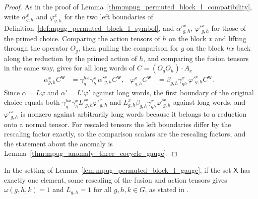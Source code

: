 \begin{proof}\leanok
    As in the proof of Lemma~\ref{thm:mpug_permuted_block_l_compatibility},
    write $\alpha^x_{g,h}$ and $\varphi^x_{g,h}$ for the two left boundaries
    of Definition~\ref{def:mpug_permuted_block_l_symbol}, and
    $\alpha'^x_{g,h}$, $\varphi'^x_{g,h}$ for those of the primed choice.
    Comparing the action tensors of $h$ on the block $x$ and lifting through
    the operator $O_g$, then pulling the comparison for $g$ on the block $hx$
    back along the reduction by the primed action of $h$, and comparing the
    fusion tensors in the same way, gives for all long words of
    $C=(O_gO_h)\cdot A_x$
    \begin{align}
        \alpha^x_{g,h}C^{\mathbf w}
         & =\gamma^{hx}_g\gamma^x_h\,\alpha'^x_{g,h}C^{\mathbf w},   &
        \varphi^x_{g,h}C^{\mathbf w}
         & =\beta_{g,h}\gamma^x_{gh}\,\varphi'^x_{g,h}C^{\mathbf w}.
        \label{eq:mpug_permuted_l_gauge_boundaries}
    \end{align}
    Since $\alpha=L\varphi$ and $\alpha'=L'\varphi'$ against long words, the
    first boundary of the original choice equals both
    $\gamma^{hx}_g\gamma^x_hL'^x_{g,h}\varphi'^x_{g,h}$ and
    $L^x_{g,h}\beta_{g,h}\gamma^x_{gh}\varphi'^x_{g,h}$ against long words,
    and $\varphi'^x_{g,h}$ is nonzero against arbitrarily long words because
    it belongs to a reduction onto a normal tensor. For rescaled tensors the left boundaries
    differ by the rescaling factor exactly, so the comparison scalars are the
    rescaling factors, and the statement about the anomaly is
    Lemma~\ref{thm:mpug_anomaly_three_cocycle_gauge}.
\end{proof}

\begin{lemma}
    \label{lem:mpug_single_block_gauge_trivial}
    \leanok
    In the setting of Lemma~\ref{lem:mpug_permuted_block_l_gauge}, if the set
    $\mathsf X$ has exactly one element, some rescaling of the fusion and
    action tensors gives $\omega(g,h,k)=1$ and $L_{g,h}=1$ for all
    $g,h,k\in G$, as stated in
    \cite[lines~1925--1926]{FrancoRubio2025MPUGauging}.
\end{lemma}


